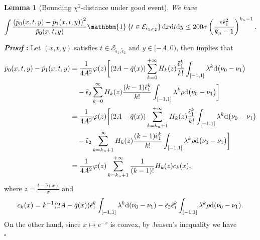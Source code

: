 \documentclass{article}
\def\eps{{\epsilon}}
\def\gE{{\mathcal{E}}}
\newcommand{\dd}{\textup{d}}
\newtheorem{lemma}{Lemma}[section]
\renewenvironment{proof}{\noindent\textbf{\textit{Proof }:}}{\hfill$\square$}
\begin{document}
\begin{lemma}[Bounding $\chi^2$-distance under good event]
    \label{lemma:chi-square-good}
    We have
    \begin{equation}
        \notag
        \int\frac{\left(\bar{p}_0(x,t,y)-\bar{p}_1(x,t,y)\right)^2}{\bar{p}_0(x,t,y)}\mathbbm{1}\left\{t\in\gE_{\tilde{\eps}_1,\tilde{\eps}_2}\right\}\dd x\dd t\dd y \leq 200\sigma\left(\frac{e\tilde{\eps}_1^2}{k_n-1}\right)^{k_n-1}.
    \end{equation}
\end{lemma}

\begin{proof}
    Let $(x,t,y)$ satisfies $t\in\gE_{\tilde{\eps}_1,\tilde{\eps}_2}$ and $y\in[-A,0)$, then  implies that
    \begin{equation}
        \label{eq:chi-square-good-diff}
        \begin{aligned}
            \bar{p}_0(x,t,y)-\bar{p}_1(x,t,y)
            &= \frac{1}{4A^2}\varphi(z)\bigg[ (2A-\hat{q}(x))\sum_{k=0}^{+\infty}H_k(z)\frac{\tilde{\eps}_1^k}{k!} \int_{[-1,1]} \lambda^k \dd\big(\nu_0-\nu_1\big) \\
            &\quad - \tilde{\eps}_2  \sum_{k=0}^{\infty} H_k(z) \frac{(k-1)\tilde{\eps}_1^k}{k!} \int_{[-1,1]} \lambda^k\rho \dd\big(\nu_0-\nu_1\big) \bigg] \\
            &= \frac{1}{4A^2}\varphi(z)\bigg[ (2A-\hat{q}(x))\sum_{k=k_n+1}^{+\infty}H_k(z)\frac{\tilde{\eps}_1^k}{k!} \int_{[-1,1]} \lambda^k \dd\big(\nu_0-\nu_1\big) \\
            &\quad - \tilde{\eps}_2  \sum_{k=k_n+1}^{\infty} H_k(z) \frac{(k-1)\tilde{\eps}_1^k}{k!} \int_{[-1,1]} \lambda^k\rho \dd\big(\nu_0-\nu_1\big) \bigg] \\
            &= \frac{1}{4A^2}\varphi(z)\sum_{k=k_n+1}^{+\infty}\frac{1}{(k-1)!} H_k(z) c_k(x),
        \end{aligned}
    \end{equation}
    where $z = \frac{t-\hat{g}(x)}{\sigma}$ and
    \begin{equation}
        \label{eq:def-ck}
        c_k(x) = k^{-1} (2A-\hat{q}(x)) \tilde{\eps}_1^k\int_{[-1,1]}\lambda^k\dd(\nu_0-\nu_1) - \tilde{\eps}_2\tilde{\eps}_1^k\int_{[-1,1]}\lambda^k\rho\dd(\nu_0-\nu_1).
    \end{equation}
    On the other hand, since $x\mapsto e^{-x}$ is convex, by Jensen's inequality we have
    \begin{equation}
        \label{eq:chi-square-good-lower-bound}

\end{equation}
\end{proof}
\end{document}
